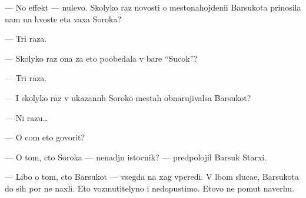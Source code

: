 \documentclass[12pt]{book}
\begin{document}
— No effekt — nulevo{\y}. Skolyko raz novosti o mestonahojdeni{\y}i Barsukota prinosila nam na hvoste eta vaxa Soroka?

— Tri raza.

— Skolyko raz ona za eto poobedala v bare ``Sucok''?

— Tri raza.

— I skoly\-ko raz v ukazann{\yi}h Soroko{\y} mestah obnarujivalsa Barsukot?

— Ni razu…

— O com eto govorit?

— O tom, cto Soroka — nenad{\e}jn{\yi}{\y} istocnik? — predpolojil Barsuk Starxi{\y}.

— Libo o tom, cto Barsukot — vsegda na xag vperedi. V l{\io}bom sluca{\y}e, Barsukota do sih por ne naxli. Eto vozmutitelyno i nedopustimo. Etovo ne po{\y}mut naverhu. 
\end{document}
